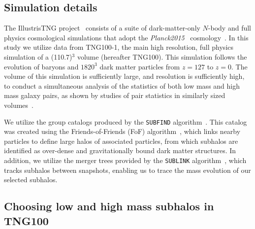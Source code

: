 \documentclass[twocolumn]{aastex631}
\begin{document}
    \subsection{Simulation details} \label{sec:methods-sims}
    The IllustrisTNG project~\citep{TNG1, TNG2, TNG3, TNG4, TNG5} consists of a suite of dark-matter-only $N$-body and full physics cosmological simulations that adopt the \textit{Planck2015} \lcdm\  cosmology~\citep{Planck2015}.
    In this study we utilize data from TNG100-1, the main high resolution, full physics simulation of a (110.7\Mpc)$^3$ volume (hereafter TNG100). 
    This simulation follows the evolution of baryons and $1820^3$ dark matter particles from $z=127$ to $z=0$.  
    The volume of this simulation is sufficiently large, and resolution is sufficiently high, to conduct a simultaneous analysis of the statistics of both low mass and high mass galaxy pairs, as shown by studies of pair statistics in similarly sized volumes~\citep{Sales2013,Patel2017a-Orbits,Patel2017b-Masses,Besla2018}. %

    We utilize the group catalogs produced by the \texttt{SUBFIND} algorithm~\citep{springel2001,dolag09}. 
    This catalog was created using the Friends-of-Friends (FoF) algorithm~\citep{davis1985}, which links nearby particles to define large halos of associated particles, from which subhalos are identified as over-dense and gravitationally bound dark matter structures.
    In addition, we utilize the merger trees provided by the \texttt{SUBLINK} algorithm~\citep{rg15}, which tracks subhalos between snapshots, enabling us to trace the mass evolution of our selected subhalos. 


    \subsection{Choosing low and high mass subhalos in TNG100} \label{sec:methods-halos}
\end{document}
